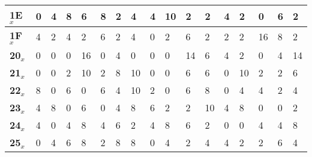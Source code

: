 \begin{longtable}[c]{|l|l|l|l|l|l|l|l|l|l|l|l|l|l|l|l|l|}
\textbf{1E$_x$} & 0              & 4              & 8              & 6              & 8              & 2              & 4              & 4              & 10             & 2              & 2              & 4              & 2              & 0              & 6              & 2              \\ \hline
\textbf{1F$_x$} & 4              & 2              & 4              & 2              & 6              & 2              & 4              & 0              & 2              & 6              & 2              & 2              & 2              & 16             & 8              & 2              \\ \hline
\textbf{20$_x$} & 0              & 0              & 0              & 16             & 0              & 4              & 0              & 0              & 0              & 14             & 6              & 4              & 2              & 0              & 4              & 14             \\ \hline
\textbf{21$_x$} & 0              & 0              & 2              & 10             & 2              & 8              & 10             & 0              & 0              & 6              & 6              & 0              & 10             & 2              & 2              & 6              \\ \hline
\textbf{22$_x$} & 8              & 0              & 6              & 0              & 6              & 4              & 10             & 2              & 0              & 6              & 8              & 0              & 4              & 4              & 2              & 4              \\ \hline
\textbf{23$_x$} & 4              & 8              & 0              & 6              & 0              & 4              & 8              & 6              & 2              & 2              & 10             & 4              & 8              & 0              & 0              & 2              \\ \hline
\textbf{24$_x$} & 4              & 0              & 4              & 8              & 4              & 6              & 2              & 4              & 8              & 6              & 2              & 0              & 0              & 4              & 4              & 8              \\ \hline
\textbf{25$_x$} & 0              & 4              & 6              & 8              & 2              & 8              & 8              & 0              & 4              & 2              & 4              & 4              & 2              & 2              & 6              & 4              \\ \hline

\end{longtable}
